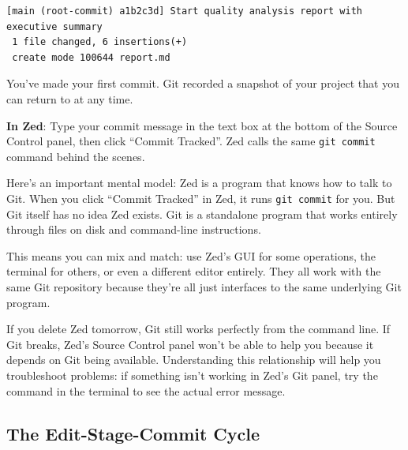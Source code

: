 \documentclass[
  letterpaper,
  DIV=11,
  numbers=noendperiod]{scrreprt}
\begin{document}
\begin{verbatim}
[main (root-commit) a1b2c3d] Start quality analysis report with executive summary
 1 file changed, 6 insertions(+)
 create mode 100644 report.md
\end{verbatim}

You've made your first commit. Git recorded a snapshot of your project
that you can return to at any time.

\textbf{In Zed}: Type your commit message in the text box at the bottom
of the Source Control panel, then click ``Commit Tracked''. Zed calls
the same \texttt{git\ commit} command behind the scenes.

\begin{tcolorbox}[enhanced jigsaw, opacitybacktitle=0.6, arc=.35mm, colback=white, bottomtitle=1mm, opacityback=0, toprule=.15mm, left=2mm, colbacktitle=quarto-callout-note-color!10!white, breakable, coltitle=black, toptitle=1mm, colframe=quarto-callout-note-color-frame, bottomrule=.15mm, titlerule=0mm, title=\textcolor{quarto-callout-note-color}{\faInfo}\hspace{0.5em}{Zed Uses Git, Not the Other Way Around}, rightrule=.15mm, leftrule=.75mm]

Here's an important mental model: Zed is a program that knows how to
talk to Git. When you click ``Commit Tracked'' in Zed, it runs
\texttt{git\ commit} for you. But Git itself has no idea Zed exists. Git
is a standalone program that works entirely through files on disk and
command-line instructions.

This means you can mix and match: use Zed's GUI for some operations, the
terminal for others, or even a different editor entirely. They all work
with the same Git repository because they're all just interfaces to the
same underlying Git program.

If you delete Zed tomorrow, Git still works perfectly from the command
line. If Git breaks, Zed's Source Control panel won't be able to help
you because it depends on Git being available. Understanding this
relationship will help you troubleshoot problems: if something isn't
working in Zed's Git panel, try the command in the terminal to see the
actual error message.

\end{tcolorbox}

\subsection{The Edit-Stage-Commit
Cycle}\label{the-edit-stage-commit-cycle}
\end{document}
